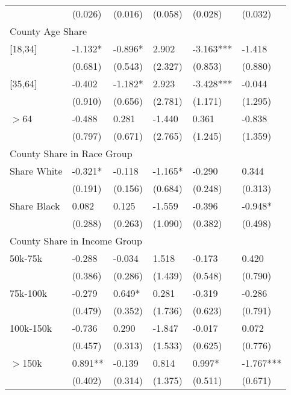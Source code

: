 \documentclass[12pt]{article}
\begin{document}
{\begin{tabular}{llllll}
							&	(0.026)	&	(0.016)	&	(0.058)	&	(0.028)	&	(0.032)	\\
\multicolumn{6}{l}{County Age Share}\\											
\hspace{0.1in}[18,34]			&	-1.132*	&	-0.896*	&	2.902	&	-3.163***	&	-1.418	\\
							&	(0.681)	&	(0.543)	&	(2.327)	&	(0.853)	&	(0.880)	\\
\hspace{0.1in}[35,64]			&	-0.402	&	-1.182*	&	2.923	&	-3.428***	&	-0.044	\\
							&	(0.910)&	(0.656)	&	(2.781)	&	(1.171)	&	(1.295)	\\
\hspace{0.1in} $>$64			&	-0.488	&	0.281	&	-1.440	&	0.361	&	-0.838	\\
							&	(0.797)	&	(0.671)	&	(2.765)	&	(1.245)	&	(1.359)	\\
\multicolumn{6}{l}{County Share in Race Group}\\											
\hspace{0.1in} Share White		&	-0.321*	&	-0.118	&	-1.165*	&	-0.290	&	0.344	\\
							&	(0.191)	&	(0.156)	&	(0.684)	&	(0.248)	&	(0.313)	\\
\hspace{0.1in} Share Black		&	0.082	&	0.125	&	-1.559	&	-0.396	&	-0.948*	\\
							&	(0.288)	&	(0.263)	&	(1.090)	&	(0.382)	&	(0.498)	\\
\multicolumn{6}{l}{County Share in Income Group}\\											
\hspace{0.1in} 50k-75k			&	-0.288	&	-0.034	&	1.518	&	-0.173	&	0.420	\\
							&	(0.386)	&	(0.286)	&	(1.439)	&	(0.548)	&	(0.790)	\\
\hspace{0.1in} 75k-100k			&	-0.279	&	0.649*	&	0.281	&	-0.319	&	-0.286	\\
							&	(0.479)	&	(0.352)	&	(1.736)	&	(0.623)	&	(0.791)	\\
\hspace{0.1in} 100k-150k			&	-0.736	&	0.290	&	-1.847	&	-0.017	&	0.072	\\
							&	(0.457)	&	(0.313)	&	(1.533)	&	(0.625)	&	(0.776)	\\
\hspace{0.1in}$>$150k			&	0.891**	&	-0.139	&	0.814	&	0.997*	&	-1.767***	\\
							&	(0.402)	&	(0.314)	&	(1.375)	&	(0.511)	&	(0.671)	\\
\hline
\end{tabular}
}
\end{document}
